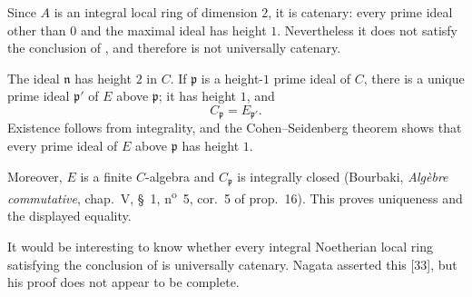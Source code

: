 \begin{example}[5.6.11]
Since $A$ is an integral local ring of dimension $2$, it is
catenary: every prime ideal other than $0$ and the maximal ideal has
height $1$.  Nevertheless it does not satisfy the conclusion of
, and therefore is not universally catenary.

The ideal $\mathfrak n$ has height $2$ in $C$.  If $\mathfrak p$ is
a height-$1$ prime ideal of $C$, there is a unique prime ideal
$\mathfrak p'$ of $E$ above $\mathfrak p$; it has height $1$, and
\[
C_{\mathfrak p}=E_{\mathfrak p'}.
\]
Existence follows from integrality, and the Cohen--Seidenberg theorem
shows that every prime ideal of $E$ above $\mathfrak p$ has height
$1$.


Moreover, $E$ is a finite $C$-algebra and
$C_{\mathfrak p}$ is integrally closed
(Bourbaki, \emph{Alg\`ebre commutative}, chap.~V, \S~1,
n\textsuperscript{o}~5, cor.~5 of prop.~16).  This proves uniqueness
and the displayed equality.

It would be interesting to know whether every integral Noetherian
local ring satisfying the conclusion of  is
universally catenary.  Nagata asserted this [33], but his proof does
not appear to be complete.
\end{example}
